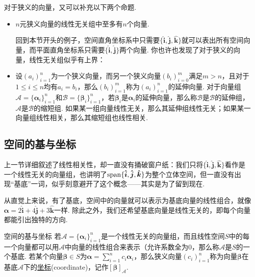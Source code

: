 \documentclass[main.tex]{subfiles}
\begin{document}
对于狭义的向量，又可以补充以下两个命题.
\begin{itemize}
    \item [(7)] \(n\)元狭义向量的线性无关组中至多有\(n\)个向量.
    \begin{note}
        回到本节开头的例子，空间直角坐标系中只需要\(\{\bm{\hat i}, \bm{\hat j}, \bm{\hat k}\}\)就可以表出所有空间向量，而平面直角坐标系只需要\(\{\bm{\hat i}, \bm{\hat j}\}\)两个向量. 你也许也发现了对于狭义的向量，线性无关组似乎有上界：
    \end{note}
    \item [(8)] 设\((a_i)_{i=1}^{n}\)为一个狭义向量，而另一个狭义向量\((b_i)_{i=0}^{m}\)满足\(m > n\)，且对于\(1\leq i \leq n\)均有\(a_i = b_i\)，那么\((b_i)_{i=1}^{m}\)称为\((a_i)_{i=1}^{n}\)的延伸向量. 对于向量组\(\mathcal{A} = \{\bm\alpha_i\}_{i=1}^{n}\)和\(\mathcal{B} = \{\bm\beta_i\}_{i=1}^{n}\)，若\(\bm\beta_i\)是\(\bm\alpha_i\)的延伸向量，那么称\(\mathcal{B}\)是\(\mathcal{B}\)的延伸组，\(\mathcal{A}\)是\(\mathcal{B}\)的缩短组. 如果某一组向量线性无关，那么其延伸组线性无关；如果某一向量组线性相关，那么其缩短组也线性相关.
\end{itemize}

\subsection{空间的基与坐标}

上一节详细叙述了线性相关性，却一直没有捅破窗户纸：我们只将\(\{\bm{\hat i}, \bm{\hat j}, \bm{\hat k}\}\)看作是一个线性无关的向量组，也讲明了\({\rm span}\{\bm{\hat i}, \bm{\hat j}, \bm{\hat k}\}\)为整个立体空间，但一直没有出现“基底”一词，似乎刻意避开了这个概念——其实是为了留到现在.

从直觉上来说，有了基底，空间中的向量就可以表示为基底向量的线性组合，就像\(\bm\alpha = 2\bm{\hat i} + 4\bm{\hat j} + 3\bm{\hat k}\)一样. 除此之外，我们还希望基底向量是线性无关的，即每个向量都能引出独特的方向.

\begin{definition}{空间的基与坐标}
    若\(\mathcal{A} = \{\bm\alpha_i\}_{i=1}^{n}\)是一个线性无关的向量组，而且线性空间\(S\)中的每一个向量都可以用\(\mathcal{A}\)中向量的线性组合来表示（允许系数全为\(0\)，那么称\(\mathcal{A}\)是\(S\)的一个基底.
    \newline
    若某个向量\(\bm\beta \in S\)为\(\displaystyle{\bm\alpha = \sum_{i=1}^{n}c_i\bm\alpha_i}\)，那么狭义向量\((c_i)_{i=1}^{n}\)称为向量\(\bm\beta\)在基底\(\mathcal{A}\)下的\uline{坐标}(coordinate)，记作\([\bm\beta]_{\mathcal{A}}\).
\end{definition}
\end{document}
